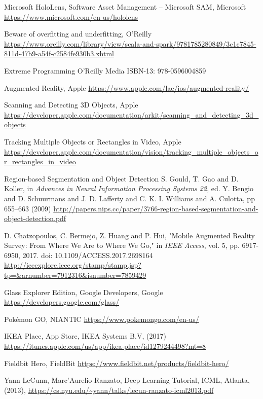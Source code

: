 
\begin{thebibliography}{X}


Microsoft HoloLens, Software Asset Management – Microsoft SAM, Microsoft
\url{https://www.microsoft.com/en-us/hololens}

Beware of overfitting and underfitting, O'Reilly
\url{https://www.oreilly.com/library/view/scala-and-spark/9781785280849/3c1c7845-811d-47b9-a54f-c2584fe930b3.xhtml}

Extreme Programming
O'Reilly Media
ISBN-13: 978-0596004859

Augmented Reality, Apple
\url{https://www.apple.com/lae/ios/augmented-reality/}

Scanning and Detecting 3D Objects, Apple
\url{https://developer.apple.com/documentation/arkit/scanning_and_detecting_3d_objects}

Tracking Multiple Objects or Rectangles in Video, Apple
\url{https://developer.apple.com/documentation/vision/tracking_multiple_objects_or_rectangles_in_video}

Region-based Segmentation and Object Detection
S. Gould, T. Gao and D. Koller, in \textit{Advances in Neural Information Processing Systems 22}, 
ed. Y. Bengio and D. Schuurmans and J. D. Lafferty 
and C. K. I. Williams and A. Culotta, 
pp 655--663
(2009)
\url{http://papers.nips.cc/paper/3766-region-based-segmentation-and-object-detection.pdf}

D. Chatzopoulos, C. Bermejo, Z. Huang and P. Hui, "Mobile Augmented Reality Survey: From Where We Are to Where We Go," in \textit{IEEE Access}, vol. 5, pp. 6917-6950, 2017.
doi: 10.1109/ACCESS.2017.2698164
\url{http://ieeexplore.ieee.org/stamp/stamp.jsp?tp=&arnumber=7912316&isnumber=7859429}

Glass Explorer Edition, Google Developers, Google
\url{https://developers.google.com/glass/}

Pokémon GO, NIANTIC
\url{https://www.pokemongo.com/en-us/}


IKEA Place, App Store, IKEA Systems B.V, (2017)
\url{https://itunes.apple.com/us/app/ikea-place/id1279244498?mt=8}

Fieldbit Hero, FieldBit
\url{https://www.fieldbit.net/products/fieldbit-hero/}

Yann LeCunn, Marc'Aurelio Ranzato, Deep Learning Tutorial, ICML, Atlanta, (2013), 
\url{https://cs.nyu.edu/~yann/talks/lecun-ranzato-icml2013.pdf}

\end{thebibliography}
